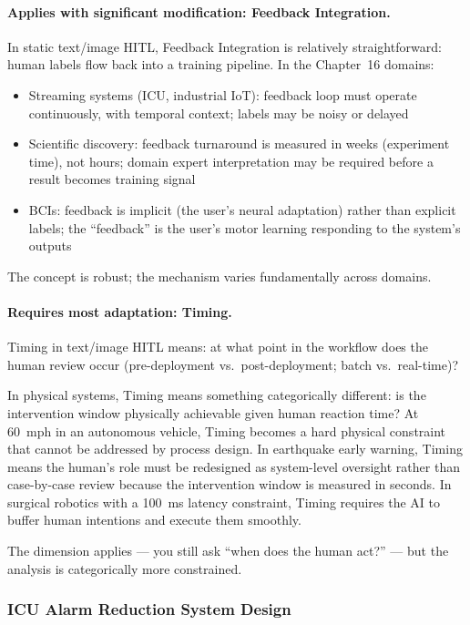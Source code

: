 \paragraph{Applies with significant modification: Feedback Integration.}

In static text/image HITL, Feedback Integration is relatively straightforward: human labels flow back into a training pipeline. In the Chapter~16 domains:
\begin{itemize}
    \item Streaming systems (ICU, industrial IoT): feedback loop must operate continuously, with temporal context; labels may be noisy or delayed
    \item Scientific discovery: feedback turnaround is measured in weeks (experiment time), not hours; domain expert interpretation may be required before a result becomes training signal
    \item BCIs: feedback is implicit (the user's neural adaptation) rather than explicit labels; the ``feedback'' is the user's motor learning responding to the system's outputs
\end{itemize}

The concept is robust; the mechanism varies fundamentally across domains.

\paragraph{Requires most adaptation: Timing.}

Timing in text/image HITL means: at what point in the workflow does the human review occur (pre-deployment vs.\ post-deployment; batch vs.\ real-time)?

In physical systems, Timing means something categorically different: is the intervention window physically achievable given human reaction time? At 60~mph in an autonomous vehicle, Timing becomes a hard physical constraint that cannot be addressed by process design. In earthquake early warning, Timing means the human's role must be redesigned as system-level oversight rather than case-by-case review because the intervention window is measured in seconds. In surgical robotics with a 100~ms latency constraint, Timing requires the AI to buffer human intentions and execute them smoothly.

The dimension applies --- you still ask ``when does the human act?'' --- but the analysis is categorically more constrained.

\subsubsection{ICU Alarm Reduction System Design}

